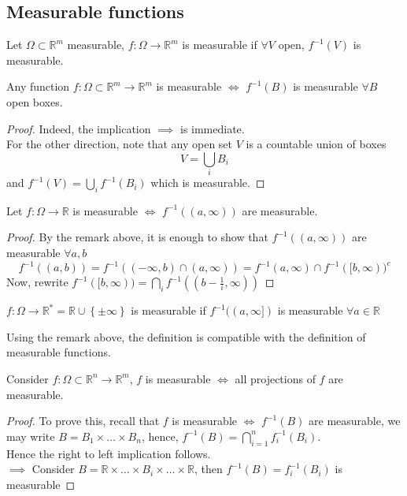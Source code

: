 \documentclass[../main.tex]{subfiles}
\begin{document}
\subsection{Measurable functions}

\begin{defn}
Let $\Omega \subset \mathbb{R}^m$ measurable, $f:\Omega\to \mathbb{R}^m$ is measurable if $\forall V$ open, $f^{-1}( V) $ is measurable.
\end{defn}
\begin{rmq}
Any function $f: \Omega \subset \mathbb{R}^m\to \mathbb{R}^m$ is measurable $\iff$ $f^{-1}( B) $ is measurable $\forall B$ open boxes. 
\begin{proof}
Indeed, the implication $\implies$ is immediate.\\
For the other direction, note that any open set $V$ is a countable union of boxes
\[ 
V= \bigcup_i B_i
\]
and $f^{-1}( V) =\bigcup_i f^{-1}( B_i) $ which is measurable.
\end{proof}
\end{rmq}
\begin{rmq}
Let $f:\Omega\to \mathbb{R}$ is measurable $\iff$ $f^{-1}( ( a, \infty ) ) $ are measurable.
\begin{proof}
By the remark above, it is enough to show that $f^{-1}( ( a, \infty ) ) $ are measurable $\forall a,b$ 
\[ 
f^{-1}( ( a,b) ) = f^{-1}( ( - \infty ,b) \cap ( a, \infty ) ) = f^{-1}( a, \infty ) \cap f^{-1}( [ b, \infty ) ) ^{c}
\]
Now, rewrite $ f^{-1}(  [ b, \infty ) )= \bigcap_i f^{-1}( ( b- \frac{1}{i}, \infty ) )  $ 
\end{proof}

\end{rmq}
\begin{defn}
	$f:\Omega\to \mathbb{R}^{*}= \mathbb{R}\cup \left\{ \pm \infty  \right\} $ is measurable if $ f^{-1}( ( a, \infty ] ) $ is measurable $\forall a \in \mathbb{R}$ 	 
\end{defn}
Using the remark above, the definition is compatible with the definition of measurable functions.\\
\begin{rmq}
Consider $f:\Omega \subset \mathbb{R}^n\to \mathbb{R}^m$, $f $ is measurable $\iff$ all projections of $f$ are measurable.
\begin{proof}
To prove this, recall that $f$ is measurable $\iff$ $f^{-1}( B)$ are measurable, we may write $B= B_1\times\ldots\times B_n$, hence, $f^{-1}( B) = \bigcap_{i=1}^{n}f_i^{-1}( B_i) $.\\
Hence the right to left implication follows.\\
$\implies$ Consider $B= \mathbb{R}\times\ldots\times B_i\times\ldots\times \mathbb{R}$, then $f^{-1}( B)= f_i^{-1}( B_i)  $ is measurable
\end{proof}
\end{rmq}
\end{document}
